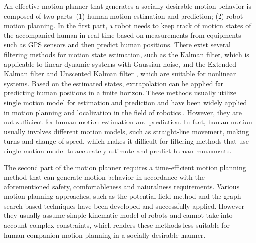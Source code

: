 \documentclass[letterpaper, 10 pt, conference]{ieeeconf}
\begin{document}
An effective motion planner that generates a socially desirable motion behavior is composed of two parts: (1) human motion estimation and prediction; (2) robot motion planning.
In the first part, a robot needs to keep track of motion states of the accompanied human in real time based on measurements from equipments such as GPS sensors and then predict human positions.
There exist several filtering methods for motion state estimation, such as the Kalman filter\cite{welch1995introduction}, which is applicable to linear dynamic systems with Gaussian noise, and the Extended Kalman filter and Unscented Kalman filter \cite {KalmanFiltering}, which are suitable for nonlinear systems.
Based on the estimated states, extrapolation can be applied for predicting human positions in a finite horizon.
These methods usually utilize single motion model for estimation and prediction and have been widely applied in motion planning and localization in the field of robotics \cite{thrun2005probabilistic}.
However, they are not sufficient for human motion estimation and prediction.
In fact, human motion usually involves different motion models, such as straight-line movement, making turns and change of speed, which makes it difficult for filtering methods that use single motion model to accurately estimate and predict human movements.


The second part of the motion planner requires a time-efficient motion planning method that can generate motion behavior in accordance with the aforementioned safety, comfortableness and naturalness requirements.
Various motion planning approaches, such as the potential field method\cite{khatib1986real} and the graph-search-based techniques\cite{cosgun2013autonomous} have been developed and successfully applied.
However they usually assume simple kinematic model of robots and cannot take into account complex constraints, which renders these methods less suitable for human-companion motion planning in a socially desirable manner.
\end{document}
